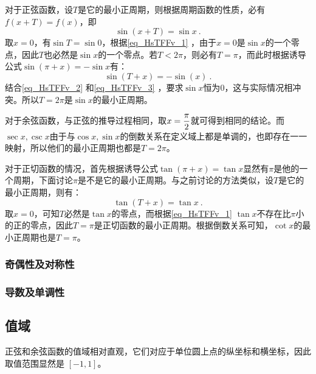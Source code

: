 对于正弦函数，设$T$是它的最小正周期，则根据周期函数的性质，必有$f(x+T)=f(x)$，即
\begin{equation}\label{eq_HsTFFv_2}
\sin (x+T)=\sin x~.
\end{equation}
取$x=0$，有$\sin T=\sin 0$，根据\autoref{eq_HsTFFv_1} ，由于$x=0$是$\sin x$的一个零点，因此$T$也必然是$\sin x$的一个零点。若$T<2\pi$，则必有$T=\pi$，而此时根据诱导公式$\sin(\pi+x)=-\sin x$有：
\begin{equation}\label{eq_HsTFFv_3}
\sin(T+x)=-\sin(x)~.
\end{equation}
结合\autoref{eq_HsTFFv_2} 和\autoref{eq_HsTFFv_3} ，要求$\sin x$恒为$0$，这与实际情况相冲突。所以$T=2\pi$是$\sin x$的最小正周期。

对于余弦函数，与正弦的推导过程相同，取$\displaystyle x={\pi\over2}$就可得到相同的结论。而$\sec x,\csc x$由于与$\cos x,\sin x$的倒数关系在定义域上都是单调的，也即存在一一映射，所以他们的最小正周期也都是$T=2\pi$。

对于正切函数的情况，首先根据诱导公式$\tan(\pi+x)=\tan x$显然有$\pi$是他的一个周期，下面讨论$\pi$是不是它的最小正周期。与之前讨论的方法类似，设$T$是它的最小正周期，则有：
\begin{equation}
\tan(T+x)=\tan x~.
\end{equation}
取$x=0$，可知$T$必然是$\tan x$的零点，而根据\autoref{eq_HsTFFv_1} $\tan x$不存在比$\pi$小的正的零点，因此$T=\pi$是正切函数的最小正周期。根据倒数关系可知，$\cot x$的最小正周期也是$T=\pi$。

\subsubsection{奇偶性及对称性}

\subsubsection{导数及单调性}

\subsection{值域}

正弦和余弦函数的值域相对直观，它们对应于单位圆上点的纵坐标和横坐标，因此取值范围显然是 $[-1,1]$。

